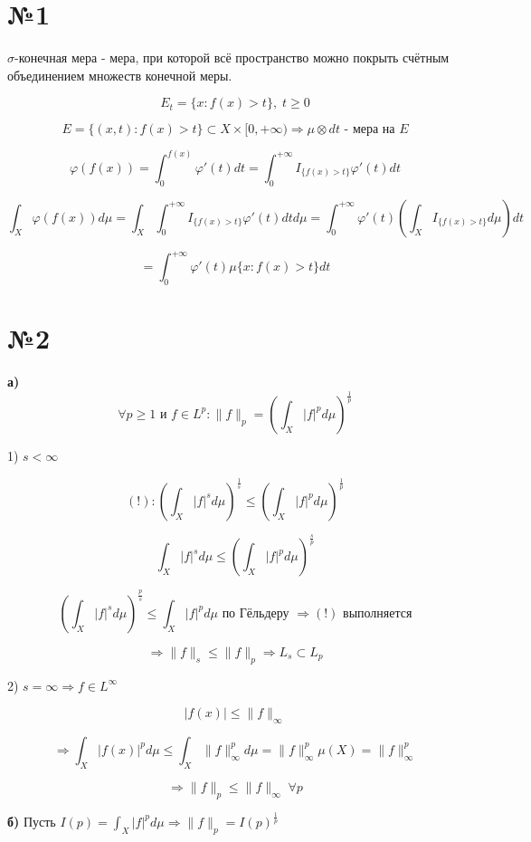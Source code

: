 \documentclass{article}
\begin{document}
\section*{№1}

\(\sigma\)-конечная мера - мера, при которой всё пространство можно покрыть счётным объединением множеств конечной меры.

\[
E_t = \{x : f(x) > t\}, \; t \ge 0
\]

\[
E = \{(x,t) : f(x) > t\} \subset X \times [0, +\infty) \Rightarrow \mu \otimes dt \text{ - мера на } E
\]

\[
\varphi(f(x)) = \int_0^{f(x)} \varphi'(t) dt = \int_0^{+\infty} I_{\{f(x) > t\}} \varphi'(t) dt
\]

\[
\int_X \varphi(f(x)) d\mu = \int_X \int_0^{+\infty} I_{\{f(x) > t\}} \varphi'(t) dt d\mu = \int_0^{+\infty} \varphi'(t) \left( \int_X I_{\{f(x) > t\}} d\mu \right) dt
\]

\[
= \int_0^{+\infty} \varphi'(t) \mu\{x : f(x) > t\} dt
\]

\section*{№2}

\textbf{а)}
\[
\forall p \ge 1 \text{ и } f \in L^p : \|f\|_p = \left( \int_X |f|^p d\mu \right)^{\frac{1}{p}}
\]

1) \(s < \infty\)

\[
(!) : \left( \int_X |f|^s d\mu \right)^{\frac{1}{s}} \le \left( \int_X |f|^p d\mu \right)^{\frac{1}{p}}
\]

\[
\int_X |f|^s d\mu \le \left( \int_X |f|^p d\mu \right)^{\frac{s}{p}}
\]

\[
\left( \int_X |f|^s d\mu \right)^{\frac{p}{s}} \le \int_X |f|^p d\mu \text{ по Гёльдеру } \Rightarrow (!) \text{ выполняется}
\]

\[
\Rightarrow \|f\|_s \le \|f\|_p \Rightarrow L_s \subset L_p
\]

2) \(s = \infty \Rightarrow f \in L^\infty\)

\[
|f(x)| \le \|f\|_\infty
\]

\[
\Rightarrow \int_X |f(x)|^p d\mu \le \int_X \|f\|_\infty^p d\mu = \|f\|_\infty^p \mu(X) = \|f\|_\infty^p
\]

\[
\Rightarrow \|f\|_p \le \|f\|_\infty \; \forall p
\]

\vspace{1em}

\textbf{б)}
Пусть \(I(p) = \int_X |f|^p d\mu \Rightarrow \|f\|_p = I(p)^{\frac{1}{p}}\)
\end{document}
